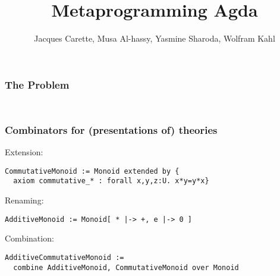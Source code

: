 \documentclass{beamer}
\title[Metaprogramming Agda]{Metaprogramming Agda}
\author[Carette, Al-hassy, Sharoda, Kahl]
  {\Large Jacques Carette, Musa Al-hassy, Yasmine Sharoda, Wolfram Kahl}
\institute[McMaster]{McMaster University}
\begin{document}
\begin{frame}
\thispagestyle{empty}
\titlepage
\end{frame}


\begin{frame}
\frametitle{The Problem}
\begin{columns}
  \hspace*{-2cm}
  \begin{column}{0.5\textwidth} 
    {\tiny {} }
    {\tiny {} }
  \end{column}
  \hspace*{-2cm}
  \begin{column}{0.5\textwidth}
    {\tiny {}}
    {\vspace*{\fill}}
  \end{column}
\end{columns}
\end{frame}

\begin{frame}[t,fragile]
\frametitle{Combinators for (presentations of) theories}
Extension:
\begin{lstlisting}
CommutativeMonoid := Monoid extended by {
  axiom commutative_* : forall x,y,z:U. x*y=y*x}
\end{lstlisting}
Renaming:
\begin{lstlisting}
AdditiveMonoid := Monoid[ * |-> +, e |-> 0 ]
\end{lstlisting}
Combination:
\begin{lstlisting}
AdditiveCommutativeMonoid := 
  combine AdditiveMonoid, CommutativeMonoid over Monoid
\end{lstlisting}
\end{frame}
\end{document}

